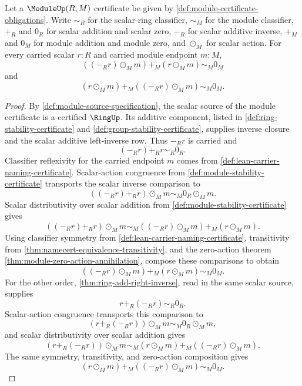 

\begin{theorem}
\label{thm:module-scalar-negation-action-additive-inverse}
Let a $\ModuleUp(R,M)$ certificate be given by \autoref{def:module-certificate-obligations}. Write $\sim_R$ for the scalar-ring classifier, $\sim_M$ for the module classifier, $+_R$ and $0_R$ for scalar addition and scalar zero, $-_R$ for scalar additive inverse, $+_M$ and $0_M$ for module addition and module zero, and $\odot_M$ for scalar action. For every carried scalar $r:R$ and carried module endpoint $m:M$,
$$
((-_R r)\odot_M m)+_M(r\odot_M m)\sim_M0_M
$$
and
$$
(r\odot_M m)+_M((-_R r)\odot_M m)\sim_M0_M.
$$
\end{theorem}
\begin{proof}
By \autoref{def:module-source-specification}, the scalar source of the module certificate is a certified $\RingUp$. Its additive component, listed in \autoref{def:ring-stability-certificate} and \autoref{def:group-stability-certificate}, supplies inverse closure and the scalar additive left-inverse row. Thus $-_R r$ is carried and
$$
(-_R r)+_R r\sim_R0_R.
$$
Classifier reflexivity for the carried endpoint $m$ comes from \autoref{def:lean-carrier-naming-certificate}. Scalar-action congruence from \autoref{def:module-stability-certificate} transports the scalar inverse comparison to
$$
((-_R r)+_R r)\odot_M m\sim_M0_R\odot_M m.
$$
Scalar distributivity over scalar addition from \autoref{def:module-stability-certificate} gives
$$
((-_R r)+_R r)\odot_M m\sim_M((-_R r)\odot_M m)+_M(r\odot_M m).
$$
Using classifier symmetry from \autoref{def:lean-carrier-naming-certificate}, transitivity from \autoref{thm:namecert-equivalence-transitivity}, and the zero-action theorem \autoref{thm:module-zero-action-annihilation}, compose these comparisons to obtain
$$
((-_R r)\odot_M m)+_M(r\odot_M m)\sim_M0_M.
$$
For the other order, \autoref{thm:ring-add-right-inverse}, read in the same scalar source, supplies
$$
r+_R(-_R r)\sim_R0_R.
$$
Scalar-action congruence transports this comparison to
$$
(r+_R(-_R r))\odot_M m\sim_M0_R\odot_M m,
$$
and scalar distributivity over scalar addition gives
$$
(r+_R(-_R r))\odot_M m\sim_M(r\odot_M m)+_M((-_R r)\odot_M m).
$$
The same symmetry, transitivity, and zero-action composition gives
$$
(r\odot_M m)+_M((-_R r)\odot_M m)\sim_M0_M.
$$
\end{proof}

